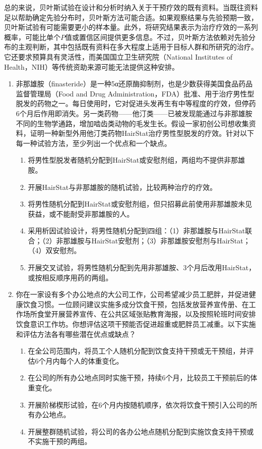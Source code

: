 总的来说，贝叶斯试验在设计和分析时纳入关于干预疗效的既有资料。当既往资料足以帮助确定先验分布时，贝叶斯方法可能合适。如果观察结果与先验预期一致，贝叶斯试验有可能需要更小的样本量。此外，将研究结果表示为治疗疗效的一系列概率，可能比单个$P$值或置信区间提供更多信息。不过，贝叶斯方法依赖对先验分布的主观判断，其中包括既有资料在多大程度上适用于目标人群和所研究的治疗。它还要求预算具有灵活性，而美国国立卫生研究院（National Institutes of Health，NIH）等传统资助来源可能无法提供这种安排。


\begin{enumerate}
\item 非那雄胺（finasteride）是一种5α还原酶抑制剂，也是少数获得美国食品药品监督管理局（Food and Drug Administration，FDA）批准、用于治疗男性型脱发的药物之一。每日使用时，它对促进头发再生有中等程度的疗效，但停药6个月后作用即消失。另一类药物——他汀类——已被发现能通过与非那雄胺不同的生物学通路，增加啮齿类动物的毛发生长。假设一家初创公司想收集资料，证明一种新型外用他汀类药物HairStat治疗男性型脱发的疗效。针对以下每一种试验方法，至少列出一个优点和一个缺点。
\begin{enumerate}
\item 将男性型脱发者随机分配到HairStat或安慰剂组，两组均不提供非那雄胺。
\item 开展HairStat与非那雄胺的随机试验，比较两种治疗的疗效。
\item 将男性随机分配到HairStat或安慰剂组，但只招募此前使用非那雄胺未见获益，或不能耐受非那雄胺的人。
\item 采用析因试验设计，将男性随机分配到四组：（1）非那雄胺与HairStat联合；（2）非那雄胺与HairStat安慰剂；（3）非那雄胺安慰剂与HairStat；（4）双安慰剂。
\item 开展交叉试验，将男性随机分配到先用非那雄胺、3个月后改用HairStat，或按相反顺序用药的两组。
\end{enumerate}
\item 你在一家设有多个办公地点的大公司工作，公司希望减少员工肥胖，并促进健康饮食习惯。一位顾问建议实施多成分饮食干预，包括发放营养宣传册、在工作场所食堂开展营养宣传、在公共区域张贴教育海报，以及按照轮班时间安排饮食意识工作坊。你想评估这项干预能否促进超重或肥胖员工减重。以下实施和评估方法各有哪些潜在优点或缺点？
\begin{enumerate}
\item 在全公司范围内，将员工个人随机分配到饮食支持干预或无干预组，并评估6个月内每个人的体重变化。
\item 在公司的所有办公地点同时实施干预，持续6个月，比较员工干预前后的体重变化。
\item 开展阶梯楔形试验，在6个月内按随机顺序，依次将饮食干预引入公司的所有办公地点。
\item 开展整群随机试验，将公司的各办公地点随机分配到实施饮食支持干预或不实施干预的两组。
\end{enumerate}
\end{enumerate}
